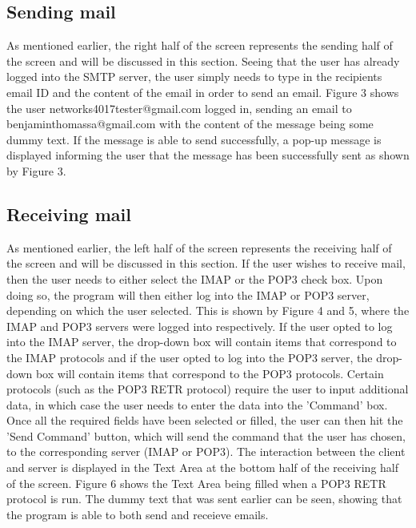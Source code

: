 \documentclass[11pt]{article}
\begin{document}
\begin{multicols}{2}
\subsection{Sending mail}
As mentioned earlier, the right half of the screen represents the sending half of the screen and will be discussed in this section. Seeing that the user has already logged into the SMTP server, the user simply needs to type in the recipients email ID and the content of the email in order to send an email. Figure 3 shows the user networks4017tester@gmail.com logged in, sending an email to benjaminthomassa@gmail.com with the content of the message being some dummy text. If the message is able to send successfully, a pop-up message is displayed informing the user that the message has been successfully sent as shown by Figure 3.
\subsection{Receiving mail}
As mentioned earlier, the left half of the screen represents the receiving half of the screen and will be discussed in this section. If the user wishes to receive mail, then the user needs to either select the IMAP or the POP3 check box. Upon doing so, the program will then either log into the IMAP or POP3 server, depending on which the user selected. This is shown by Figure 4 and 5, where the IMAP and POP3 servers were logged into respectively. If the user opted to log into the IMAP server, the drop-down box will contain items that correspond to the IMAP protocols and if the user opted to log into the POP3 server, the drop-down box will contain items that correspond to the POP3 protocols. Certain protocols (such as the POP3 RETR protocol) require the user to input additional data, in which case the user needs to enter the data into the 'Command' box. Once all the required fields have been selected or filled, the user can then hit the 'Send Command' button, which will send the command that the user has chosen, to the corresponding server (IMAP or POP3). The interaction between the client and server is displayed in the Text Area at the bottom half of the receiving half of the screen. Figure 6 shows the Text Area being filled when a POP3 RETR protocol is run. The dummy text that was sent earlier can be seen, showing that the program is able to both send and receieve emails.

\end{multicols}
\end{document}
